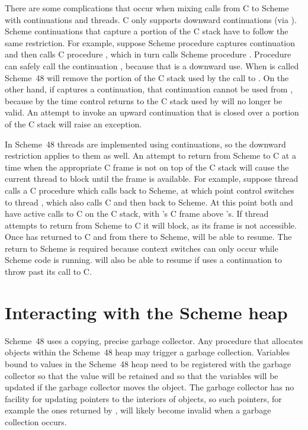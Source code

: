 There are some complications that occur when mixing calls from C to Scheme
 with continuations and threads.
C only supports downward continuations (via ).
Scheme continuations that capture a portion of the C stack have to follow the
 same restriction.
For example, suppose Scheme procedure  captures continuation 
 and then calls C procedure , which in turn calls Scheme procedure
 .
Procedure  can safely call the continuation , because that
 is a downward use.
When  is called Scheme~48 will remove the portion of the C stack used
 by the call to .
On the other hand, if  captures a continuation, that continuation
 cannot be used from , because by the time control returns to
  the C stack used by  will no longer be valid.
An attempt to invoke an upward continuation that is closed over a portion
 of the C stack will raise an exception.

In Scheme~48 threads are implemented using continuations, so the downward
 restriction applies to them as well.
An attempt to return from Scheme to C at a time when the appropriate
 C frame is not on top of the C stack will cause the current thread to
 block until the frame is available.
For example, suppose thread  calls a C procedure which calls back
 to Scheme, at which point control switches to thread , which also
 calls C and then back to Scheme.
At this point both  and  have active calls to C on the
 C stack, with 's C frame above 's.
If thread  attempts to return from Scheme to C it will block,
 as its frame is not accessible.
Once  has returned to C and from there to Scheme,  will
 be able to resume.
The return to Scheme is required because context switches can only occur while
 Scheme code is running.
 will also be able to resume if  uses a continuation to
 throw past its call to C.

\section{Interacting with the Scheme heap}
\label{sec:heap-allocation}
\label{gc}

Scheme~48 uses a copying, precise garbage collector.
Any procedure that allocates objects within the Scheme~48 heap may trigger
 a garbage collection.
Variables bound to values in the Scheme~48 heap need to be registered with
 the garbage collector so that the value will be retained and so that the
 variables will be updated if the garbage collector moves the object.
The garbage collector has no facility for updating pointers to the interiors
 of objects, so such pointers, for example the ones returned by
 , will likely become invalid when a garbage collection
 occurs.

